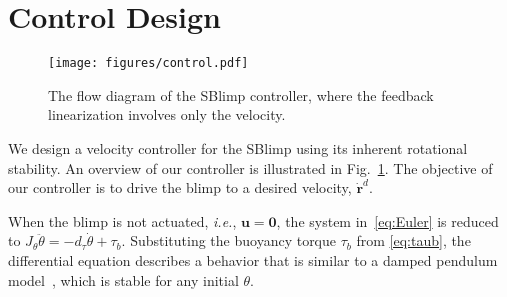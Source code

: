 \documentclass[conference]{ieeeconf}
\begin{document}
\section{Control Design}
\label{sec:control}

\begin{figure}
    \centering
    \texttt{[image: figures/control.pdf]}
    \caption{The flow diagram of the SBlimp controller, where the feedback linearization involves only the velocity.}
    \label{fig:controldiag}
    \vspace{-1em}
\end{figure}

We design a velocity controller for the SBlimp using its inherent rotational stability.
An overview of our controller is illustrated in Fig.~\ref{fig:controldiag}. The objective of our controller is to drive the blimp to a desired velocity, $\boldsymbol{\dot{r}}^d$. 

When the blimp is not actuated, \textit{i.e.}, $\boldsymbol{u}=\boldsymbol{0}$, the system in~\eqref{eq:Euler} is reduced to $J_\theta\ddot{\theta} = -d_\tau\dot{\theta} + \tau_b$. Substituting the buoyancy torque $\tau_b$ from \eqref{eq:taub}, the differential equation describes a behavior that is similar to a damped pendulum model~\cite{baker2008pendulum}, which is stable for any initial $\theta$. 
\end{document}
